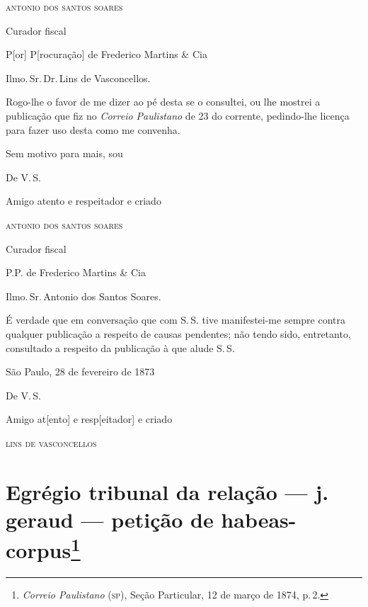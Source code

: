\begin{flushright}
\textsc{antonio dos santos soares}

Curador fiscal

P{[}or{]} P{[}rocuração{]} de Frederico Martins \& Cia
\end{flushright}

\asterisc

Ilmo.\,Sr.\,Dr.\,Lins de Vasconcellos.

Rogo-lhe o favor de me dizer ao pé desta se o consultei, ou lhe mostrei
a publicação que fiz no \emph{Correio Paulistano} de 23 do corrente,
pedindo-lhe licença para fazer uso desta como me convenha.

\begin{flushright}
Sem motivo para mais, sou

De V.\,S.

Amigo atento e respeitador e criado

\textsc{antonio dos santos soares}

Curador fiscal

P.P. de Frederico Martins \& Cia
\end{flushright}

\asterisc

Ilmo.\,Sr.\,Antonio dos Santos Soares.

É verdade que em conversação que com S.\,S. tive manifestei-me sempre
contra qualquer publicação a respeito de causas pendentes; não tendo
sido, entretanto, consultado a respeito da publicação à que alude S.\,S.

\begin{flushright}
São Paulo, 28 de fevereiro de 1873

De V.\,S.

Amigo at{[}ento{]} e resp{[}eitador{]} e criado

\textsc{lins de vasconcellos}
\end{flushright}

\chapter{Egrégio tribunal da relação --- j. geraud --- petição de habeas-corpus\footnote{\emph{Correio Paulistano} (\textsc{sp}), Seção Particular,
  12 de março de 1874, p.\,2.}} %

